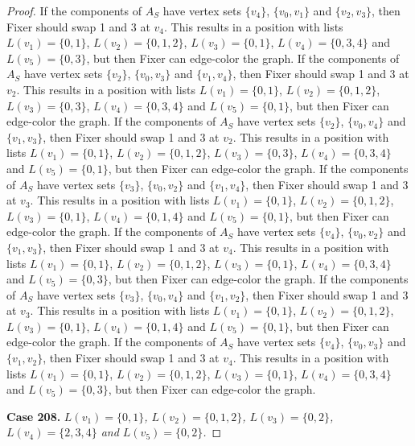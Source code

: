 \documentclass[12pt]{amsart}
\theoremstyle{plain}
\theoremstyle{definition}
\theoremstyle{remark}
\begin{document}
\begin{proof}
If the components of $A_S$ have vertex sets $\{v_4\}$, $\{v_0, v_1\}$ and $\{v_2, v_3\}$, then Fixer should swap 1 and 3 at $v_4$. This results in a position with lists $L(v_1) = \{0, 1\}$, $L(v_2) = \{0, 1, 2\}$, $L(v_3) = \{0, 1\}$, $L(v_4) = \{0, 3, 4\}$ and $L(v_5) = \{0, 3\}$, but then Fixer can edge-color the graph.
If the components of $A_S$ have vertex sets $\{v_2\}$, $\{v_0, v_3\}$ and $\{v_1, v_4\}$, then Fixer should swap 1 and 3 at $v_2$. This results in a position with lists $L(v_1) = \{0, 1\}$, $L(v_2) = \{0, 1, 2\}$, $L(v_3) = \{0, 3\}$, $L(v_4) = \{0, 3, 4\}$ and $L(v_5) = \{0, 1\}$, but then Fixer can edge-color the graph.
If the components of $A_S$ have vertex sets $\{v_2\}$, $\{v_0, v_4\}$ and $\{v_1, v_3\}$, then Fixer should swap 1 and 3 at $v_2$. This results in a position with lists $L(v_1) = \{0, 1\}$, $L(v_2) = \{0, 1, 2\}$, $L(v_3) = \{0, 3\}$, $L(v_4) = \{0, 3, 4\}$ and $L(v_5) = \{0, 1\}$, but then Fixer can edge-color the graph.
If the components of $A_S$ have vertex sets $\{v_3\}$, $\{v_0, v_2\}$ and $\{v_1, v_4\}$, then Fixer should swap 1 and 3 at $v_3$. This results in a position with lists $L(v_1) = \{0, 1\}$, $L(v_2) = \{0, 1, 2\}$, $L(v_3) = \{0, 1\}$, $L(v_4) = \{0, 1, 4\}$ and $L(v_5) = \{0, 1\}$, but then Fixer can edge-color the graph.
If the components of $A_S$ have vertex sets $\{v_4\}$, $\{v_0, v_2\}$ and $\{v_1, v_3\}$, then Fixer should swap 1 and 3 at $v_4$. This results in a position with lists $L(v_1) = \{0, 1\}$, $L(v_2) = \{0, 1, 2\}$, $L(v_3) = \{0, 1\}$, $L(v_4) = \{0, 3, 4\}$ and $L(v_5) = \{0, 3\}$, but then Fixer can edge-color the graph.
If the components of $A_S$ have vertex sets $\{v_3\}$, $\{v_0, v_4\}$ and $\{v_1, v_2\}$, then Fixer should swap 1 and 3 at $v_3$. This results in a position with lists $L(v_1) = \{0, 1\}$, $L(v_2) = \{0, 1, 2\}$, $L(v_3) = \{0, 1\}$, $L(v_4) = \{0, 1, 4\}$ and $L(v_5) = \{0, 1\}$, but then Fixer can edge-color the graph.
If the components of $A_S$ have vertex sets $\{v_4\}$, $\{v_0, v_3\}$ and $\{v_1, v_2\}$, then Fixer should swap 1 and 3 at $v_4$. This results in a position with lists $L(v_1) = \{0, 1\}$, $L(v_2) = \{0, 1, 2\}$, $L(v_3) = \{0, 1\}$, $L(v_4) = \{0, 3, 4\}$ and $L(v_5) = \{0, 3\}$, but then Fixer can edge-color the graph.

\noindent\textbf{Case 208.  }\textit{$L(v_1) = \{0, 1\}$, $L(v_2) = \{0, 1, 2\}$, $L(v_3) = \{0, 2\}$, $L(v_4) = \{2, 3, 4\}$ and $L(v_5) = \{0, 2\}$.}


\end{proof}
\end{document}

